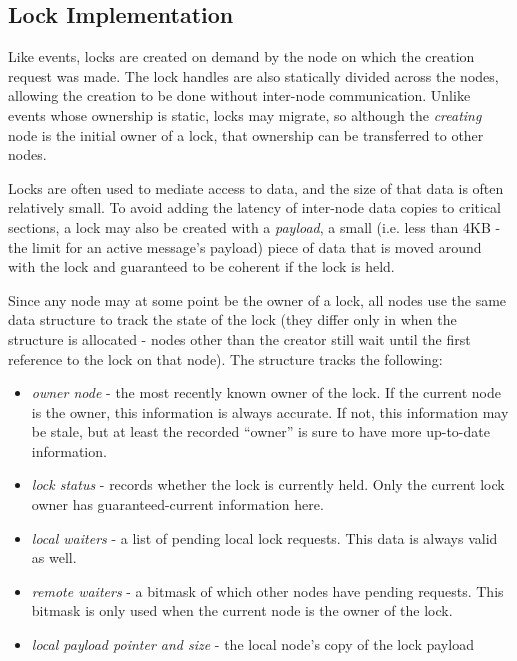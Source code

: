 
\subsection{Lock Implementation}
\label{subsec:lockimpl}

Like events, locks are created on demand by the node on which the creation request was made.  The lock
handles are also statically divided across the nodes, allowing the creation to be done without inter-node
communication.  Unlike events whose ownership is static, locks may migrate, so although the {\em creating}
node is the initial owner of a lock, that ownership can be transferred to other nodes.

Locks are often used to mediate access to data, and the size of that data is often relatively small.  To
avoid adding the latency of inter-node data copies to critical sections, a lock may also be created with a
{\em payload}, a small (i.e. less than 4KB - the limit for an active message's payload) piece of data that is moved around with the lock and guaranteed to be coherent if
the lock is held.

Since any node may at some point be the owner of a lock, all nodes use the same data structure to track the
state of the lock (they differ only in when the structure is allocated -
nodes other than the creator still wait until the first reference to the lock on that node).  The structure
tracks the following:
\begin{itemize}
\item {\em owner node} - the most recently known owner of the lock.  If the current node is the owner, this
information is always accurate.  If not, this information may be stale, but at least the recorded ``owner''
is sure to have more up-to-date information.
\item {\em lock status} - records whether the lock is currently held.  Only the current lock owner has
guaranteed-current information here.
\item {\em local waiters} - a list of pending local lock requests.  This data is always valid as well.
\item {\em remote waiters} - a bitmask of which other nodes have pending requests.  This bitmask is only
used when the current node is the owner of the lock.
\item {\em local payload pointer and size} - the local node's copy of the lock payload
\end{itemize}

